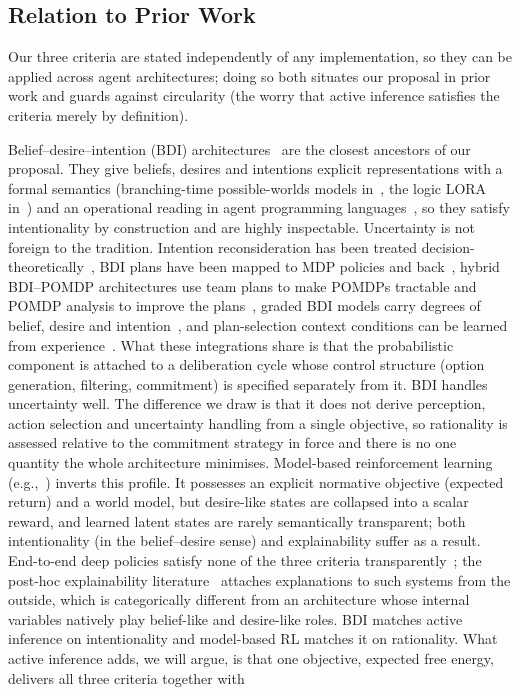 \documentclass[letterpaper]{article} %
\theoremstyle{definition}
\begin{document}
\subsection{Relation to Prior Work}\label{sec:priorwork}

Our three criteria are stated independently of any implementation, so they can be applied across agent architectures; doing so both situates our proposal in prior work and guards against circularity (the worry that active inference satisfies the criteria merely by definition).

Belief--desire--intention (BDI) architectures~\citep{bratmanIntention1987,cohenIntentionChoiceCommitment1990,raoModelingRationalAgents1991,raoBDIAgents1995} are the closest ancestors of our proposal. They give beliefs, desires and intentions explicit representations with a formal semantics (branching-time possible-worlds models in~\citet{raoModelingRationalAgents1991}, the logic LORA in~\citet{wooldridgeReasoningRationalAgents2000}) and an operational reading in agent programming languages~\citep{bordiniProgrammingMultiAgentJason2007,dastani2APL2008,boissierJaCaMo2013}, so they satisfy intentionality by construction and are highly inspectable. Uncertainty is not foreign to the tradition. Intention reconsideration has been treated decision-theoretically~\citep{schutIntentionReconsideration2004}, BDI plans have been mapped to MDP policies and back~\citep{simariMDPsBDI2006}, hybrid BDI--POMDP architectures use team plans to make POMDPs tractable and POMDP analysis to improve the plans~\citep{nairHybridBDIPOMDP2005,bautersAgentSpeakPOMDP2016}, graded BDI models carry degrees of belief, desire and intention~\citep{casaliGradedBDI2011}, and plan-selection context conditions can be learned from experience~\citep{singhLearningContextBDI2010}. What these integrations share is that the probabilistic component is attached to a deliberation cycle whose control structure (option generation, filtering, commitment) is specified separately from it. BDI handles uncertainty well. The difference we draw is that it does not derive perception, action selection and uncertainty handling from a single objective, so rationality is assessed relative to the commitment strategy in force and there is no one quantity the whole architecture minimises. Model-based reinforcement learning (e.g.,~\citep{hansenTDMPC2ScalableRobust2024}) inverts this profile. It possesses an explicit normative objective (expected return) and a world model, but desire-like states are collapsed into a scalar reward, and learned latent states are rarely semantically transparent; both intentionality (in the belief--desire sense) and explainability suffer as a result. End-to-end deep policies satisfy none of the three criteria transparently~\citep{liptonMythosModelInterpretability2018}; the post-hoc explainability literature~\citep{arrietaExplainableAI2020} attaches explanations to such systems from the outside, which is categorically different from an architecture whose internal variables natively play belief-like and desire-like roles. BDI matches active inference on intentionality and model-based RL matches it on rationality. What active inference adds, we will argue, is that one objective, expected free energy, delivers all three criteria together with 
\end{document}
